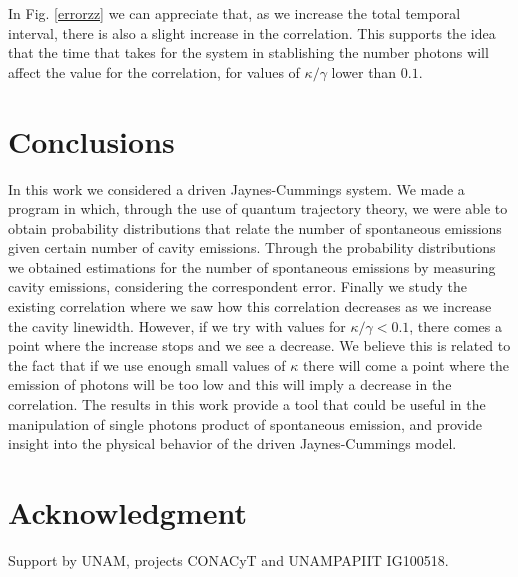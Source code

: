 \documentclass[conference]{IEEEtran}
\begin{document}
In Fig. \ref{errorzz} we can appreciate that, as we increase the total temporal interval, there is also a slight increase in the correlation. This supports the idea that the time that takes for the system in stablishing the number photons will affect the value for the correlation, for values of $\kappa/\gamma$ lower than $0.1$.

\section{Conclusions}
In this work we considered a driven Jaynes-Cummings system. We made a program in which, through the use of quantum trajectory theory, we were able to obtain probability distributions that relate the number of spontaneous emissions given certain number of cavity emissions. Through the probability distributions we obtained estimations for the number of spontaneous emissions by measuring cavity emissions, considering the correspondent error. Finally we study the existing correlation where we saw how this correlation decreases as we increase the cavity linewidth. However, if we try with values for  $\kappa/\gamma < 0.1$, there comes a point where the increase stops and we see a decrease. We believe this is related to the fact that if we use enough small values of $\kappa$ there will come a point where the emission of photons will be too low and this will imply a decrease in the correlation. The results in this work provide a tool that could be useful in the manipulation of single photons product of spontaneous emission, and provide insight into the physical behavior of the driven Jaynes-Cummings model.


\section*{Acknowledgment}

Support by UNAM, projects CONACyT and UNAMPAPIIT IG100518.




\end{document}
